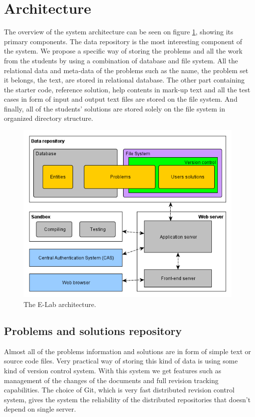\documentclass{llncs}
\begin{document}
\section{Architecture}

The overview of the system architecture can be seen on figure \ref{fig:architecture}, showing its
primary components. The data repository is the most interesting component of the
system. We propose a specific way of storing the problems and all the work from
the students by using a combination of database and file system. All the
relational data and meta-data of the problems such as the name, the problem set
it belongs, the text, are stored in relational database. The other part
containing the starter code, reference solution, help contents in mark-up text
and all the test cases in form of input and output text files are stored on the
file system. And finally, all of the students' solutions are stored solely on
the file system in organized directory structure. 

\begin{figure}
\centering
\includegraphics[width=.99\textwidth]{e-lab/architecture}
\caption{The E-Lab architecture.}
\label{fig:architecture}
\end{figure}

\subsection{Problems and solutions repository}

Almost all of the problems information and solutions are in form of simple text
or source code files. Very practical way of storing this kind of data is using
some kind of version control system. With this system we get features such as
management of the changes of the documents and full revision tracking
capabilities. The choice of Git, which is very fast distributed revision control
system, gives the system the reliability of the distributed repositories that
doesn't depend on single server.
\end{document}
